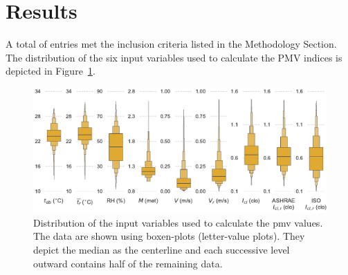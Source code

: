 

\section{Results}\label{sec:results}

A total of  entries met the inclusion criteria listed in the Methodology Section.
The distribution of the six input variables used to calculate the PMV indices is depicted in Figure~\ref{fig:dist_input_data}.

\begin{figure}
    \centering
    \includegraphics[width=\textwidth]{figures/dist_input_data}
    \caption{Distribution of the input variables used to calculate the \ac{pmv} values.
    The data are shown using boxen-plots (letter-value plots).
    They depict the median as the centerline and each successive level outward contains half of the remaining data.}
    \label{fig:dist_input_data}
\end{figure}
